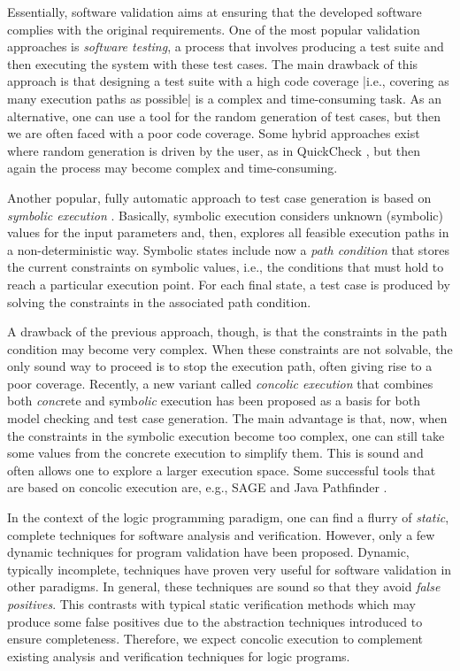 \documentclass[fleqn]{tlp}
\begin{document}
Essentially, software validation aims at ensuring that the developed
software complies with the original requirements. One of the most
popular validation approaches is \emph{software testing}, a process
that involves producing a test suite and then executing the system
with these test cases. The main drawback of this approach is that
designing a test suite with a high code coverage |i.e., covering as
many execution paths as possible| is a complex and time-consuming
task. As an alternative, one can use a tool for the random generation
of test cases, but then we are often faced with a poor code coverage.
Some hybrid approaches exist where random generation is
driven by the user, as in QuickCheck \cite{CH00}, but then again the
process may become complex and time-consuming.

Another popular, fully automatic approach to test case generation is
based on \emph{symbolic execution} \cite{Kin76,Cla76}. Basically,
symbolic execution considers unknown (symbolic) values for the input
parameters and, then, explores all feasible execution paths in a
non-deterministic way. Symbolic states include now a \emph{path
  condition} that stores the current constraints on symbolic values,
i.e., the conditions that must hold to reach a particular execution
point. For each final state, a test case is produced by solving
the constraints in the associated path condition.

A drawback of the previous approach, though, is that the constraints
in the path condition may become very complex. When these constraints
are not solvable, the only sound way to proceed is to stop the
execution path, often giving rise to a poor coverage.  Recently, a new
variant called \emph{concolic execution} \cite{GKS05,SMA05} that
combines both \emph{conc}rete and symb\emph{olic} execution has been
proposed as a basis for both model checking and test case
generation. The main advantage is that, now, when the constraints in
the symbolic execution become too complex, one can still take some
values from the concrete execution to simplify them. This is sound and
often allows one to explore a larger execution space.  Some successful
tools that are based on concolic execution are, e.g., SAGE
\cite{GLM12} and Java Pathfinder \cite{PR10}.

In the context of the logic programming paradigm, one can find a
flurry of \emph{static}, complete techniques for software analysis and
verification. However, only a few dynamic techniques for program
validation have been proposed. Dynamic, typically incomplete,
techniques have proven very useful for software validation in other
paradigms. In general, these techniques are sound so that they avoid
\emph{false positives}. This contrasts with typical static
verification methods which may produce some false positives due to the
abstraction techniques introduced to ensure completeness. Therefore,
we expect concolic execution to complement 
existing analysis and verification techniques for logic programs.
\end{document}
